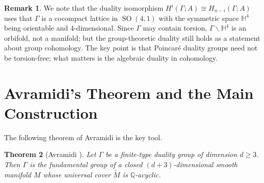 \documentclass[12pt]{article}
\newtheorem{theorem}{Theorem}
\theoremstyle{definition}
\newtheorem{remark}[theorem]{Remark}
\DeclareMathOperator{\SO}{SO}
\begin{document}
\begin{remark}
We note that the duality isomorphism $H^i(\Gamma;A) \cong H_{n-i}(\Gamma;A)$ uses that
$\Gamma$ is a cocompact lattice in $\SO(4,1)$ with the symmetric space $\mathbb{H}^4$ being
orientable and $4$-dimensional.  Since $\Gamma$ may contain torsion, $\Gamma \backslash
\mathbb{H}^4$ is an orbifold, not a manifold; but the group-theoretic duality still holds as
a statement about group cohomology.  The key point is that Poincar\'e duality groups need
not be torsion-free; what matters is the algebraic duality in cohomology.
\end{remark}

\section{Avramidi's Theorem and the Main Construction}

The following theorem of Avramidi is the key tool.

\begin{theorem}[Avramidi \cite{Avramidi2018}]\label{thm:avramidi}
  Let $\Gamma$ be a finite-type duality group of dimension $d \geq 3$.  Then $\Gamma$
  is the fundamental group of a closed $(d+3)$-dimensional smooth manifold $M$ whose
  universal cover $\widetilde{M}$ is $\mathbb{Q}$-acyclic.
\end{theorem}
\end{document}
